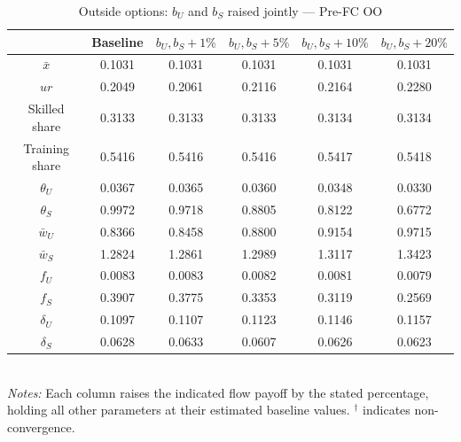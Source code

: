 \begin{table}[htbp]
\centering
\caption{Outside options: \(b_U\) and \(b_S\) raised jointly — Pre-FC OO}
\label{tab:oo_bUS_pre-fc_oo}
\small
\begin{tabular}{c c c c c c}
\toprule
  & Baseline & $b_U,b_S +1\%$ & $b_U,b_S +5\%$ & $b_U,b_S +10\%$ & $b_U,b_S +20\%$ \\
\midrule
\(\bar{x}\) & 0.1031 & 0.1031 & 0.1031 & 0.1031 & 0.1031 \\
\(ur\) & 0.2049 & 0.2061 & 0.2116 & 0.2164 & 0.2280 \\
Skilled share & 0.3133 & 0.3133 & 0.3133 & 0.3134 & 0.3134 \\
Training share & 0.5416 & 0.5416 & 0.5416 & 0.5417 & 0.5418 \\
\(\theta_U\) & 0.0367 & 0.0365 & 0.0360 & 0.0348 & 0.0330 \\
\(\theta_S\) & 0.9972 & 0.9718 & 0.8805 & 0.8122 & 0.6772 \\
\(\bar{w}_U\) & 0.8366 & 0.8458 & 0.8800 & 0.9154 & 0.9715 \\
\(\bar{w}_S\) & 1.2824 & 1.2861 & 1.2989 & 1.3117 & 1.3423 \\
\(f_U\) & 0.0083 & 0.0083 & 0.0082 & 0.0081 & 0.0079 \\
\(f_S\) & 0.3907 & 0.3775 & 0.3353 & 0.3119 & 0.2569 \\
\(\delta_U\) & 0.1097 & 0.1107 & 0.1123 & 0.1146 & 0.1157 \\
\(\delta_S\) & 0.0628 & 0.0633 & 0.0607 & 0.0626 & 0.0623 \\
\bottomrule
\end{tabular}
\\[2pt]
\footnotesize
\textit{Notes:} Each column raises the indicated flow payoff by the stated percentage, holding all other parameters at their estimated baseline values. \(^{\dagger}\) indicates non-convergence.
\end{table}
